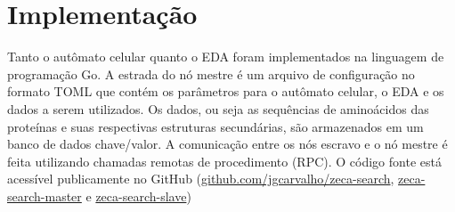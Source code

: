 \section{Implementação}

Tanto o autômato celular quanto o EDA foram implementados na linguagem de programação Go. A estrada do nó mestre é um arquivo de configuração no formato TOML que contém os parâmetros para o autômato celular, o EDA e os dados a serem utilizados. Os dados, ou seja as sequências de aminoácidos das proteínas e suas respectivas estruturas secundárias, são armazenados em um banco de dados chave/valor. A comunicação entre os nós escravo e o nó mestre é feita utilizando chamadas remotas de procedimento (RPC). O código fonte está acessível publicamente no GitHub (\href{https://github.com/jgcarvalho/zeca-search}{github.com/jgcarvalho/zeca-search}, \href{https://github.com/jgcarvalho/zeca-search-master}{zeca-search-master} e \href{https://github.com/jgcarvalho/zeca-search-slave}{zeca-search-slave})  

